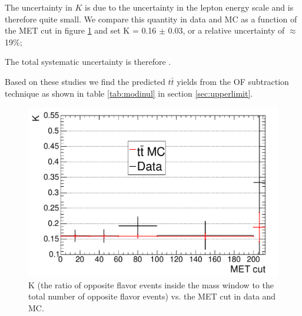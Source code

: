 The uncertainty in $K$ is due to the uncertainty in the lepton energy scale and is therefore quite small.
We compare this quantity in data and \ttbar MC as a function of the MET cut
in figure \ref{fig:kmc}
and set K = 0.16 $\pm$ 0.03, or a relative uncertainty of $\approx$19\%;

The total systematic uncertainty is therefore \ofsystpercentage.

Based on these studies we find the predicted $t\bar{t}$ yields from the OF subtraction technique 
as shown in table \ref{tab:modinul} in section \ref{sec:upperlimit}.



\begin{figure}[tbh]
  \begin{center}
	\includegraphics[width=0.48\linewidth]{plots/kvmet_data_ttbm.pdf}
	\caption{
	  \label{fig:kmc}\protect 
	  K (the ratio of opposite flavor events inside the \Z mass window
	  to the total number of opposite flavor events)
	  vs. the MET cut in data and \ttbar MC.
	}
  \end{center}
\end{figure}

